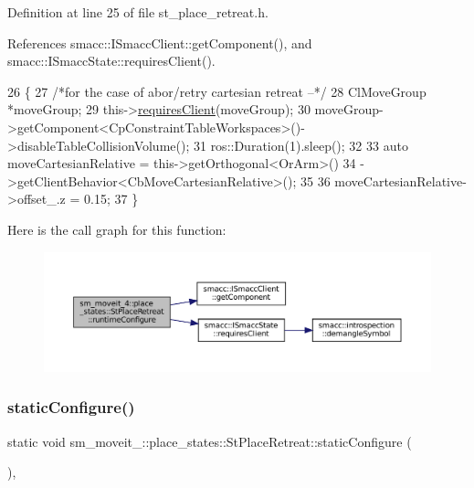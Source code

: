 Definition at line 25 of file st\+\_\+place\+\_\+retreat.\+h.



References smacc\+::\+I\+Smacc\+Client\+::get\+Component(), and smacc\+::\+I\+Smacc\+State\+::requires\+Client().


\begin{DoxyCode}
26     \{
27         \textcolor{comment}{/*for the case of abor/retry cartesian retreat --*/}
28         ClMoveGroup *moveGroup;
29         this->\hyperlink{classsmacc_1_1ISmaccState_a7f95c9f0a6ea2d6f18d1aec0519de4ac}{requiresClient}(moveGroup);
30         moveGroup->getComponent<CpConstraintTableWorkspaces>()->disableTableCollisionVolume();
31         ros::Duration(1).sleep();
32         
33         \textcolor{keyword}{auto} moveCartesianRelative = this->getOrthogonal<OrArm>()
34                                          ->getClientBehavior<CbMoveCartesianRelative>();
35 
36         moveCartesianRelative->offset\_.z = 0.15;
37     \}
\end{DoxyCode}
Here is the call graph for this function\+:
\nopagebreak
\begin{figure}[H]
\begin{center}
\leavevmode
\includegraphics[width=350pt]{structsm__moveit__4_1_1place__states_1_1StPlaceRetreat_a592a95bb086fd10381dee175af55e71e_cgraph}
\end{center}
\end{figure}
\mbox{\label{structsm__moveit__4_1_1place__states_1_1StPlaceRetreat_aa3f44a56c5471fb113afb7b3cfd7d44e}} 
\subsubsection{\texorpdfstring{static\+Configure()}{staticConfigure()}}
{\footnotesize\ttfamily static void sm\+\_\+moveit\+\_\+::place\+\_\+states\+::\+St\+Place\+Retreat\+::static\+Configure (\begin{DoxyParamCaption}{ }\end{DoxyParamCaption})\hspace{0.3cm}{\ttfamily [inline]}, {\ttfamily [static]}}



